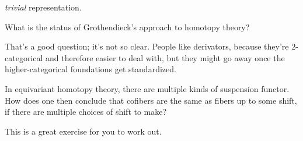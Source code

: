 \emph{trivial} representation.
\begin{ques}
What is the status of Grothendieck's approach to homotopy theory?
\end{ques}
That's a good question; it's not so clear. People like derivators, because they're $2$-categorical and therefore
easier to deal with, but they might go away once the higher-categorical foundations get standardized.
\begin{ques}
In equivariant homotopy theory, there are multiple kinds of suspension functor. How does one then conclude that
cofibers are the same as fibers up to some shift, if there are multiple choices of shift to make?
\end{ques}
This is a great exercise for you to work out.


